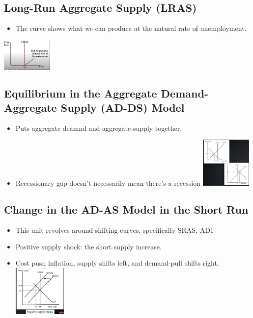 \documentclass[8pt]{beamer}
\begin{document}
  \begin{frame}
	\section{Long-Run Aggregate Supply (LRAS)}
	\begin{itemize}
		\item The curve shows what we can produce at the natural rate of unemployment.
	\end{itemize}
	\includegraphics[width=2.5cm]{2021-10-12-12-18-10.png}
  \end{frame}
  \begin{frame}
	\section{Equilibrium in the Aggregate Demand-Aggregate Supply (AD-DS) Model}
	\begin{itemize}
		\item Puts aggregate deamnd and aggregate-supply together.
		\item Recessionary gap doesn't necessarily mean there's a recession
		\includegraphics[width=2.5cm]{2021-10-12-12-45-18.png}
	\end{itemize}
  \end{frame}
  \begin{frame}
	\section{Change in the AD-AS Model in the Short Run}
	\begin{itemize}
		\item This unit revolves around shifting curves, specifically SRAS, AD1
		\item Positive supply shock: the short supply increase.
		\item Cost push inflation, supply shifts left, and demand-pull shifts right.
		\includegraphics[height=2.5cm]{2021-10-12-12-47-38.png}
	\end{itemize}
  \end{frame}
\end{document}
